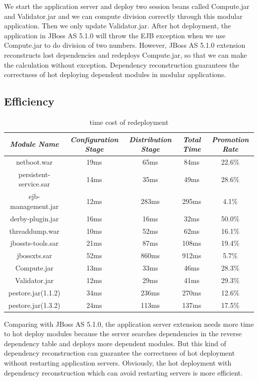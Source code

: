 \documentclass[conference]{IEEEtran}
\begin{document}
We start the application server and deploy two session beans called Compute.jar and Validator.jar and we can compute division correctly through this modular application.
Then we only update Validator.jar.
After hot deployment, the application in JBoss AS 5.1.0 will throw the EJB exception when we use Compute.jar to do division of two numbers.
However, JBoss AS 5.1.0 extension reconstructs lost dependencies and redeploys Compute.jar, so that we can make the calculation without exception.
Dependency reconstruction guarantees the correctness of hot deploying dependent modules in modular applications.

\subsection{Efficiency}


\begin{table}
\centering
\caption{time cost of redeployment}
\label{tab:stage}
\begin{tabular}{|c|c|c|c|c|}
\hline
\emph{Module Name}	&	\emph{Configuration Stage}	&	\emph{Distribution Stage}	&	\emph{Total Time}	&	\emph{Promotion Rate}\\
\hline
\hline
netboot.war		&	19ms		 	&	65ms			&	84ms			&	22.6\%\\
\hline
persistent-service.sar 	& 	14ms 			&	35ms			&	49ms			&	28.6\%\\
\hline
ejb-management.jar	& 	12ms		 	&	283ms			&	295ms			&	4.1\%\\
\hline
derby-plugin.jar	&	16ms			&	16ms			&	32ms			&	50.0\%\\
\hline
threaddump.war		&	10ms			&	52ms			&	62ms			&	16.1\%\\
\hline
jbossts-tools.sar	&	21ms			&	87ms			&	108ms			&	19.4\%\\
\hline
jbossxts.sar		&	52ms			&	860ms			&	912ms			&	5.7\%\\
\hline
Compute.jar		&	13ms			&	33ms			&	46ms			&	28.3\%\\
\hline
Validator.jar		&	12ms			&	29ms			&	41ms			&	29.3\%\\
\hline
pestore.jar(1.1.2)	&	34ms			&	236ms			&	270ms			&	12.6\%\\
\hline
pestore.jar(1.3.2)	&	24ms			&	113ms			&	137ms			&	17.5\%\\
\hline
\end{tabular}
\end{table}

Comparing with JBoss AS 5.1.0, the application server extension needs more time to hot deploy modules because the server searches dependencies in the reverse dependency table and deploys more dependent modules.
But this kind of dependency reconstruction can guarantee the correctness of hot deployment without restarting application servers.
Obviously, the hot deployment with dependency reconstruction which can avoid restarting servers is more efficient.
\end{document}
